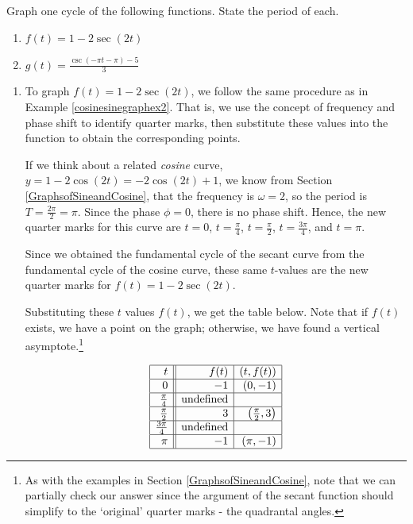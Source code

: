 \documentclass{ximera}
\begin{document}
\begin{example}  \label{seccscgraphex} Graph one cycle of the following functions.  State the period of each.

\begin{enumerate}

\item  $f(t) = 1 - 2 \sec(2t)$

\item  $g(t) = \frac{\csc(- \pi t - \pi) - 5}{3}$

\end{enumerate}

\begin{explanation}  

\begin{enumerate}

\item  To graph $f(t) = 1 - 2 \sec(2t)$, we follow the same procedure as in Example \ref{cosinesinegraphex2}.  That is, we use the concept of frequency and phase shift to identify quarter marks, then substitute these values into the function to obtain the corresponding points.

If we think about a related \textit{cosine} curve, $y = 1 - 2\cos(2t) = -2\cos(2t) + 1$, we know from  Section \ref{GraphsofSineandCosine}, that the frequency is $\omega = 2$, so the period is $T = \frac{2\pi}{2} = \pi$. Since the phase $\phi = 0$, there is no phase shift.  Hence, the new quarter marks for this curve are $t=0$, $t=\frac{\pi}{4}$, $t=\frac{\pi}{2}$, $t=\frac{3\pi}{4}$, and $t=\pi$. 

Since we obtained the fundamental cycle of the secant curve from the fundamental cycle of the cosine curve, these same $t$-values are the new quarter marks for $f(t) = 1 - 2 \sec(2t)$.

Substituting these $t$ values $f(t)$, we get the table below.  Note that if $f(t)$ exists, we have a point on the graph;  otherwise, we have found a vertical asymptote.\footnote{As with the examples in Section \ref{GraphsofSineandCosine}, note that we can partially check our answer since the argument of the secant function should simplify to the `original' quarter marks - the quadrantal angles.}

\[ \begin{array}{|r||r|r|}  \hline
t & f(t) & (t,f(t))  \\ \hline
0  & - 1 & (0,-1)  \\ \hline
\frac{\pi}{4}  & \text{undefined} &  \\\hline 
\frac{\pi}{2}  & 3 & \left(\frac{\pi}{2}, 3 \right)  \\ \hline 
\frac{3\pi}{4}  & \text{undefined} &  \\ \hline 
\pi & -1 &   (\pi, -1) \\ \hline 
\end{array} \] 


\end{enumerate}
\end{explanation}
\end{example}
\end{document}
